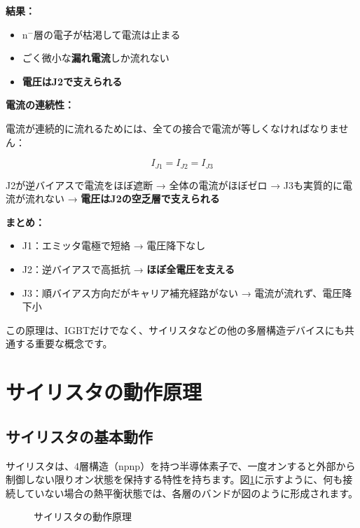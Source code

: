\textbf{結果：}

\begin{itemize}
\item n$^-$層の電子が枯渇して電流は止まる
\item ごく微小な\textbf{漏れ電流}しか流れない
\item \textbf{電圧はJ2で支えられる}
\end{itemize}

\textbf{電流の連続性：}

電流が連続的に流れるためには、全ての接合で電流が等しくなければなりません：

\begin{equation}
I_{J1} = I_{J2} = I_{J3}
\end{equation}

J2が逆バイアスで電流をほぼ遮断 → 全体の電流がほぼゼロ → J3も実質的に電流が流れない → \textbf{電圧はJ2の空乏層で支えられる}

\textbf{まとめ：}

\begin{itemize}
\item J1：エミッタ電極で短絡 → 電圧降下なし
\item J2：逆バイアスで高抵抗 → \textbf{ほぼ全電圧を支える}
\item J3：順バイアス方向だがキャリア補充経路がない → 電流が流れず、電圧降下小
\end{itemize}

この原理は、IGBTだけでなく、サイリスタなどの他の多層構造デバイスにも共通する重要な概念です。

\section{サイリスタの動作原理}

\subsection{サイリスタの基本動作}

サイリスタは、4層構造（npnp）を持つ半導体素子で、一度オンすると外部から制御しない限りオン状態を保持する特性を持ちます。図\ref{fig:thyristor}に示すように、何も接続していない場合の熱平衡状態では、各層のバンドが図のように形成されます。

\begin{figure}[H]
\centering
{}
\caption{サイリスタの動作原理}
\label{fig:thyristor}
\end{figure}

